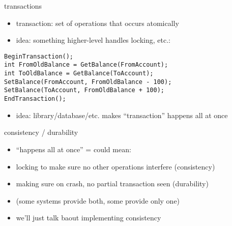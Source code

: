 \begin{frame}[fragile]{transactions}
    \begin{itemize}
    \item transaction: set of operations that occurs atomically
    \item idea: something higher-level handles locking, etc.:
   \end{itemize}
\begin{Verbatim}
BeginTransaction();
int FromOldBalance = GetBalance(FromAccount);
int ToOldBalance = GetBalance(ToAccount);
SetBalance(FromAccount, FromOldBalance - 100);
SetBalance(ToAccount, FromOldBalance + 100);
EndTransaction();
\end{Verbatim}
    \begin{itemize}
    \item idea: library/database/etc. makes ``transaction'' happens all at once
    \end{itemize}
\end{frame}

\begin{frame}{consistency / durability}
    \begin{itemize}
    \item ``happens all at once'' = could mean:
    \vspace{.5cm}
    \item locking to make sure no other operations interfere (consistency)
    \item making sure on crash, no partial transaction seen (durability)
    \vspace{.5cm}
    \item \small (some systems provide both, some provide only one)
    \item we'll just talk baout implementing consistency
    \end{itemize}
\end{frame}
